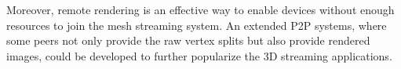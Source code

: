 Moreover, remote rendering is an effective way to enable devices without enough resources to 
join the mesh streaming system. An extended P2P systems, where some peers not only provide the raw vertex splits
but also provide rendered images, could be developed to further popularize the 3D streaming applications.
